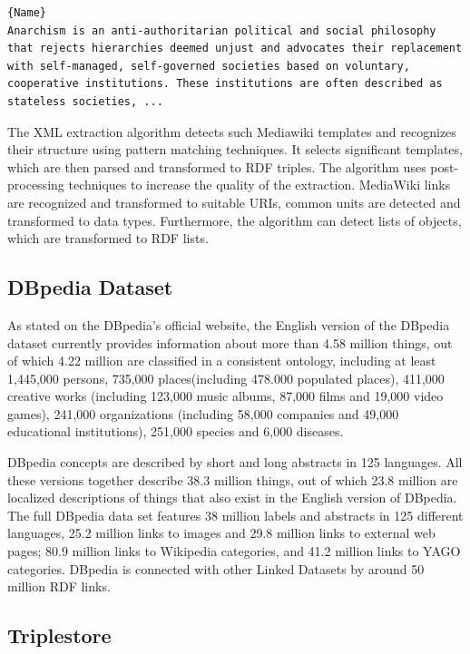 \documentclass[thesis=M,english,hidelinks]{FITthesis}[2019/12/23]
\begin{document}
\begin{lstlisting}[caption=Cleaned Wikipedia text,frame=tlrb, label = {lst:cleaned-wikipedia-text}]{Name}
Anarchism is an anti-authoritarian political and social philosophy that rejects hierarchies deemed unjust and advocates their replacement with self-managed, self-governed societies based on voluntary, cooperative institutions. These institutions are often described as stateless societies, ...
\end{lstlisting}

The XML extraction algorithm detects such Mediawiki templates and recognizes their structure using pattern matching techniques. It selects significant templates, which are then parsed and transformed to RDF triples. The algorithm uses post-processing techniques to increase the quality of the extraction. MediaWiki links are recognized and transformed to suitable URIs, common units are detected and transformed to data types. Furthermore, the algorithm can detect lists of objects, which are transformed to RDF lists.

\subsection{DBpedia Dataset}

As stated on the DBpedia's official website\cite{DBpedia_facts}, the English version of the DBpedia dataset currently provides information about more than 4.58 million things, out of which 4.22 million are classified in a consistent ontology, including at least 1,445,000 persons, 735,000 places(including 478.000 populated places), 411,000 creative works (including 123,000 music albums, 87,000 films and 19,000 video games), 241,000 organizations (including 58,000 companies and 49,000 educational institutions), 251,000 species and 6,000 diseases.

DBpedia concepts are described by short and long abstracts in 125 languages. All these versions together describe 38.3 million things, out of which 23.8 million are localized descriptions of things that also exist in the English version of DBpedia. The full DBpedia data set features 38 million labels and abstracts in 125 different languages, 25.2 million links to images and 29.8 million links to external web pages; 80.9 million links to Wikipedia categories, and 41.2 million links to YAGO categories. DBpedia is connected with other Linked Datasets by around 50 million RDF links.

\subsection{Triplestore}
\end{document}
